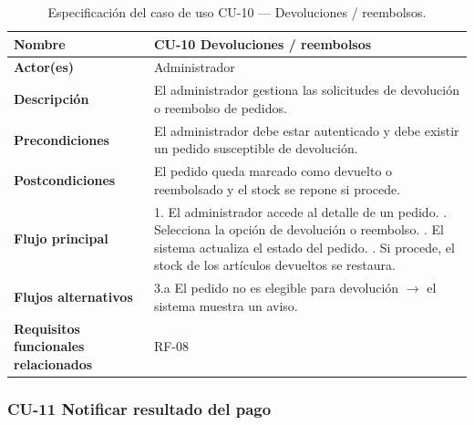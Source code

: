 \begin{table}[H]
\centering
\small
\begin{tabular}{|m{}|m{}|}
\hline
\textbf{Nombre} & CU-10 Devoluciones / reembolsos \\ \hline
\textbf{Actor(es)} & Administrador \\ \hline
\textbf{Descripción} & El administrador gestiona las solicitudes de devolución o reembolso de pedidos. \\ \hline
\textbf{Precondiciones} & El administrador debe estar autenticado y debe existir un pedido susceptible de devolución. \\ \hline
\textbf{Postcondiciones} & El pedido queda marcado como devuelto o reembolsado y el stock se repone si procede. \\ \hline
\textbf{Flujo principal} & 1. El administrador accede al detalle de un pedido. \newline 2. Selecciona la opción de devolución o reembolso. \newline 3. El sistema actualiza el estado del pedido. \newline 4. Si procede, el stock de los artículos devueltos se restaura. \\ \hline
\textbf{Flujos alternativos} & 3.a El pedido no es elegible para devolución $\rightarrow$ el sistema muestra un aviso. \\ \hline
\textbf{Requisitos funcionales relacionados} & RF-08 \\ \hline
\end{tabular}
\caption{Especificación del caso de uso CU-10 — Devoluciones / reembolsos.}
\end{table}

\subsubsection{CU-11 Notificar resultado del pago}

